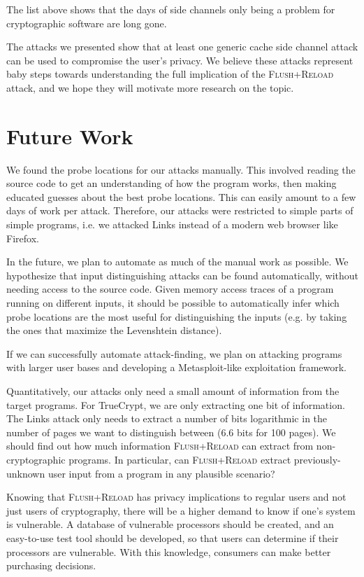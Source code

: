 \documentclass[letterpaper,twocolumn,10pt]{article}
\begin{document}
The list above shows that the days of side channels only being a problem for
cryptographic software are long gone. 

The attacks we presented show that at least one generic cache side channel
attack can be used to compromise the user's privacy. We believe these attacks
represent baby steps towards understanding the full implication of the
\textsc{Flush+Reload} attack, and we hope they will motivate more research on
the topic.

\section{Future Work}
\label{sec:future}

We found the probe locations for our attacks manually. This involved reading the
source code to get an understanding of how the program works, then making
educated guesses about the best probe locations. This can easily amount to a few
days of work per attack. Therefore, our attacks were restricted to simple parts
of simple programs, i.e. we attacked Links instead of a modern web browser like
Firefox.

In the future, we plan to automate as much of the manual work as possible. We
hypothesize that input distinguishing attacks can be found automatically,
without needing access to the source code. Given memory access traces of
a program running on different inputs, it should be possible to automatically
infer which probe locations are the most useful for distinguishing the inputs
(e.g. by taking the ones that maximize the Levenshtein distance).

If we can successfully automate attack-finding, we plan on attacking programs
with larger user bases and developing a Metasploit-like exploitation framework.

Quantitatively, our attacks only need a small amount of information from the
target programs. For TrueCrypt, we are only extracting one bit of information.
The Links attack only needs to extract a number of bits logarithmic in the
number of pages we want to distinguish between (6.6 bits for 100 pages). We
should find out how much information \textsc{Flush+Reload} can extract from
non-cryptographic programs. In particular, can \textsc{Flush+Reload} extract
previously-unknown user input from a program in any plausible scenario?

Knowing that \textsc{Flush+Reload} has privacy implications to regular users and
not just users of cryptography, there will be a higher demand to know if one's
system is vulnerable. A database of vulnerable processors should be created, and
an easy-to-use test tool should be developed, so that users can determine if
their processors are vulnerable. With this knowledge, consumers can make better
purchasing decisions.
\end{document}
